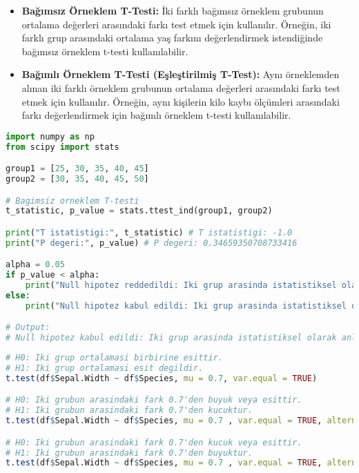 \begin{itemize}
    \item \textbf{Bağımsız Örneklem T-Testi:} İki farklı bağımsız örneklem grubunun ortalama değerleri arasındaki farkı test etmek için kullanılır. Örneğin, iki farklı grup arasındaki ortalama yaş farkını değerlendirmek istendiğinde bağımsız örneklem t-testi kullanılabilir.
    \item \textbf{Bağımlı Örneklem T-Testi (Eşleştirilmiş T-Test):} Aynı örneklemden alınan iki farklı örneklem grubunun ortalama değerleri arasındaki farkı test etmek için kullanılır. Örneğin, aynı kişilerin kilo kaybı ölçümleri arasındaki farkı değerlendirmek için bağımlı örneklem t-testi kullanılabilir.
\end{itemize}

\begin{lstlisting}[language=Python]
import numpy as np
from scipy import stats

group1 = [25, 30, 35, 40, 45]
group2 = [30, 35, 40, 45, 50]

# Bagimsiz orneklem T-testi
t_statistic, p_value = stats.ttest_ind(group1, group2)

print("T istatistigi:", t_statistic) # T istatistigi: -1.0
print("P degeri:", p_value) # P degeri: 0.34659350708733416

alpha = 0.05
if p_value < alpha:
    print("Null hipotez reddedildi: Iki grup arasinda istatistiksel olarak anlamli bir fark vardir.")
else:
    print("Null hipotez kabul edildi: Iki grup arasinda istatistiksel olarak anlamli bir fark yoktur.")

# Output:
# Null hipotez kabul edildi: Iki grup arasinda istatistiksel olarak anlamli bir fark yoktur.
\end{lstlisting}

\begin{lstlisting}[language=R]
# H0: Iki grup ortalamasi birbirine esittir.
# H1: Iki grup ortalamasi esit degildir.
t.test(df$Sepal.Width ~ df$Species, mu = 0.7, var.equal = TRUE)

# H0: Iki grubun arasindaki fark 0.7'den buyuk veya esittir.
# H1: Iki grubun arasindaki fark 0.7'den kucuktur.
t.test(df$Sepal.Width ~ df$Species, mu = 0.7 , var.equal = TRUE, alternative = "less")

# H0: Iki grubun arasindaki fark 0.7'den kucuk veya esittir.
# H1: Iki grubun arasindaki fark 0.7'den buyuktur.
t.test(df$Sepal.Width ~ df$Species, mu = 0.7 , var.equal = TRUE, alternative = "greater")
\end{lstlisting}

